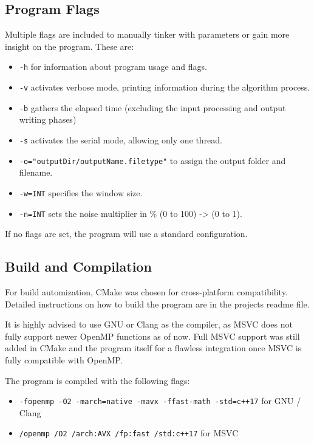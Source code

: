 \documentclass[sigconf]{acmart}
\begin{document}
\subsection{Program Flags}

Multiple flags are included to manually tinker with parameters or gain more insight on the program.
These are:

\begin{itemize}
    \item \texttt{-h} for information about program usage and flags.
    \item \texttt{-v} activates verbose mode, printing information during the algorithm process.
    \item \texttt{-b} gathers the elapsed time (excluding the input processing and output writing phases) 
    \item \texttt{-s} activates the serial mode, allowing only one thread.
    \item \texttt{-o="outputDir/outputName.filetype"} to assign the output folder and filename.
    \item \texttt{-w=INT} specifies the window size.
    \item \texttt{-n=INT} sets the noise multiplier in \% (0 to 100) -> (0 to 1).
\end{itemize}

If no flags are set, the program will use a standard configuration. 

\subsection{Build and Compilation}

For build automization, CMake was chosen for cross-platform compatibility. Detailed instructions on how to build the program are in the projects readme file. 

It is highly advised to use GNU or Clang as the compiler, as MSVC does not fully support newer OpenMP functions as of now. Full MSVC support was still added in CMake and the program itself for a flawless integration once MSVC is fully compatible with OpenMP.

The program is compiled with the following flags:
\begin{itemize}
    \item \texttt{-fopenmp -O2 -march=native -mavx -ffast-math -std=c++17} for GNU / Clang
    \item \texttt{/openmp /O2 /arch:AVX /fp:fast /std:c++17} for MSVC
\end{itemize}
\end{document}
